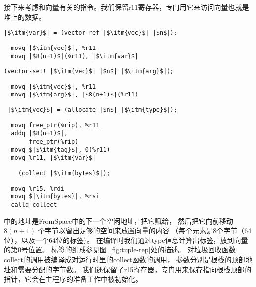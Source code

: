 接下来考虑和向量有关的指令。我们保留r11寄存器，专门用它来访问向量也就是堆上的数据。
\begin{transformation}
\begin{lstlisting}
|$\itm{var}$| = (vector-ref |$\itm{vec}$| |$n$|);
\end{lstlisting}
\compilesto
\begin{lstlisting}
  movq |$\itm{vec}$|, %r11
  movq |$8(n+1)$|(%r11), |$\itm{var}$|
\end{lstlisting}
\end{transformation}

\begin{transformation}
\begin{lstlisting}
(vector-set! |$\itm{vec}$| |$n$| |$\itm{arg}$|);
\end{lstlisting}
\compilesto
\begin{lstlisting}
  movq |$\itm{vec}$|, %r11
  movq |$\itm{arg}$|, |$8(n+1)$|(%r11)
\end{lstlisting}
\end{transformation}

\begin{transformation}
\begin{lstlisting}
 |$\itm{vec}$| = (allocate |$n$| |$\itm{type}$|);
\end{lstlisting}
\compilesto
\begin{lstlisting}
  movq free_ptr(%rip), %r11
  addq |$8(n+1)$|,
       free_ptr(%rip)
  movq $|$\itm{tag}$|, 0(%r11)
  movq %r11, |$\itm{var}$|
\end{lstlisting}
\end{transformation}

\begin{transformation}
\begin{lstlisting}
    (collect |$\itm{bytes}$|);
\end{lstlisting}
\compilesto
\begin{lstlisting}
  movq %r15, %rdi
  movq $|\itm{bytes}|, %rsi
  callq collect
\end{lstlisting}
\end{transformation}

中的地址是FromSpace中的下一个空闲地址，把它赋给，
然后把它向前移动$8(n+1)$ 个字节以留出足够的空间来放置向量的内容
（每个元素是8个字节（64位），以及一个64位的标签）。
在编译时我们通过type信息计算出标签，放到向量的第0号位置。
标签的组成参见图~\ref{fig:tuple-rep}处的描述。
对垃圾回收函数collect的调用被编译成对运行时里的collect函数的调用，
参数分别是根栈的顶部地址和需要分配的字节数。
我们还保留了r15寄存器，专门用来保存指向根栈顶部的指针，它会在主程序的准备工作中被初始化。

